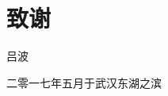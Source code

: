 \chapter{致\quad 谢}
\renewcommand{\leftmark}{致\quad 谢}

\blindtext

\blindtext

\blindtext

\blindtext

\vspace{3em}

\hspace{25em}吕\quad 波
\vspace{1em}

\hfill 二零一七年五月于武汉东湖之滨

